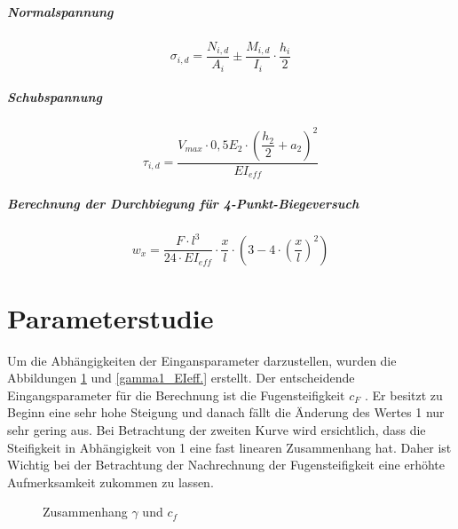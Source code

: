 \subparagraph{Normalspannung}

\begin{equation}
\sigma_{i,d}=\dfrac{N_{i,d}}{A_{i}}\pm\dfrac{M_{i,d}}{I_{i}} \cdot \dfrac{h_{i}}{2}
\end{equation}

\subparagraph{Schubspannung}

\begin{equation}
\tau_{i,d}=\dfrac{V_{max}\cdot 0,5 E_{2}\cdot(\dfrac{h_{2}}{2}+a_{2})^2}{EI_{eff}}
\end{equation}


\subparagraph{Berechnung der Durchbiegung für 4-Punkt-Biegeversuch}

\begin{equation}
w_{x}=\dfrac{F \cdot l^{3}}{24 \cdot EI_{eff}}\cdot \dfrac{x}{l} \cdot (3-4\cdot(\dfrac{x}{l})^{2})
\label{math:wx}
\end{equation}

\section{Parameterstudie}
Um die Abhängigkeiten der Eingansparameter darzustellen, wurden die Abbildungen
\ref{c_gamma1} und \ref{gamma1_EIeff.} erstellt. Der entscheidende Eingangsparameter für die Berechnung ist die
Fugensteifigkeit $c_{F}$ . Er besitzt zu Beginn eine sehr hohe Steigung und danach fällt die
Änderung des Wertes 1 nur sehr gering aus. Bei Betrachtung der zweiten Kurve wird
ersichtlich, dass die Steifigkeit in Abhängigkeit von 1 eine fast linearen Zusammenhang
hat. Daher ist Wichtig bei der Betrachtung der Nachrechnung der Fugensteifigkeit
eine erhöhte Aufmerksamkeit zukommen zu lassen.


\begin{figure}[h!]
\begin{center}
\caption{Zusammenhang $\gamma$ und $c_{f}$ }
\label{c_gamma1}
\end{center}
\end{figure}


